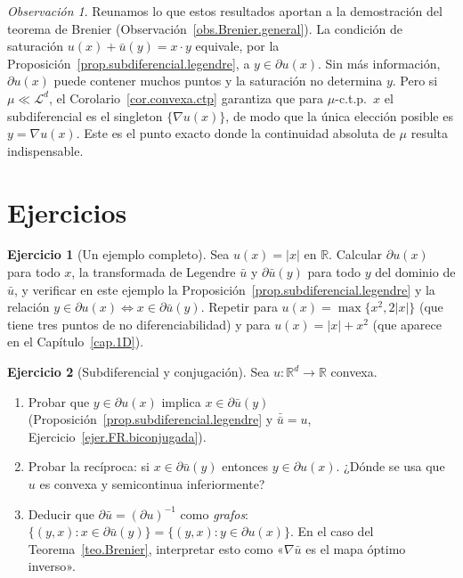 \documentclass[12pt, a4paper]{amsbook}
\newcommand{\R}{{\mathbb R}}
\theoremstyle{remark}
\newtheorem{obs}[teo]{Observación}
\theoremstyle{definition}
\newtheorem{ejercicio}{Ejercicio}[chapter]
\numberwithin{section}{chapter}
\numberwithin{subsection}{section}
\numberwithin{equation}{section}
\numberwithin{figure}{chapter}
\begin{document}
\begin{obs}
Reunamos lo que estos resultados aportan a la demostración del teorema de
Brenier (Observación~\ref{obs.Brenier.general}). La condición de saturación
$u(x)+\bar u(y)=x\cdot y$ equivale, por la
Proposición~\ref{prop.subdiferencial.legendre}, a $y\in\partial u(x)$. Sin
más información, $\partial u(x)$ puede contener muchos puntos y la saturación
no determina $y$. Pero si $\mu\ll\mathcal L^d$, el
Corolario~\ref{cor.convexa.ctp} garantiza que para $\mu$-c.t.p.\ $x$ el
subdiferencial es el singleton $\{\nabla u(x)\}$, de modo que la única
elección posible es $y=\nabla u(x)$. Este es el punto exacto donde la
continuidad absoluta de $\mu$ resulta indispensable.
\end{obs}


\section*{Ejercicios}

\begin{ejercicio}[Un ejemplo completo]\label{ejer.subdif.ejemplo}
Sea $u(x)=|x|$ en $\R$. Calcular $\partial u(x)$ para todo $x$, la
transformada de Legendre $\bar u$ y $\partial\bar u(y)$ para todo $y$ del
dominio de $\bar u$, y verificar en este ejemplo la
Proposición~\ref{prop.subdiferencial.legendre} y la relación
$y\in\partial u(x)\iff x\in\partial\bar u(y)$. Repetir para $u(x)=\max\{x^2,2|x|\}$ (que tiene tres puntos de no
diferenciabilidad) y para $u(x)=|x|+x^2$ (que aparece en el
Capítulo~\ref{cap.1D}).
\end{ejercicio}

\begin{ejercicio}[Subdiferencial y conjugación]\label{ejer.subdif.conjugacion}
Sea $u\colon\R^d\to\R$ convexa.
\begin{enumerate}[label=(\alph*)]
\item Probar que $y\in\partial u(x)$ implica $x\in\partial\bar u(y)$
(Proposición~\ref{prop.subdiferencial.legendre} y $\bar{\bar u}=u$,
Ejercicio~\ref{ejer.FR.biconjugada}).
\item Probar la recíproca: si $x\in\partial\bar u(y)$ entonces
$y\in\partial u(x)$. ¿Dónde se usa que $u$ es convexa y semicontinua
inferiormente?
\item Deducir que $\partial\bar u=(\partial u)^{-1}$ como
\emph{grafos}: $\{(y,x):x\in\partial\bar u(y)\}=\{(y,x):y\in\partial u(x)\}$.
En el caso del Teorema~\ref{teo.Brenier}, interpretar esto como
«$\nabla\bar u$ es el mapa óptimo inverso».
\end{enumerate}
\end{ejercicio}
\end{document}
